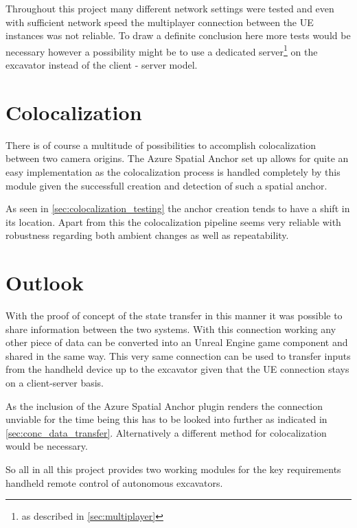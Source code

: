 Throughout this project many different network settings were tested and even with sufficient network speed the multiplayer connection between the UE instances was not reliable. To draw a definite conclusion here more tests would be necessary however a possibility might be to use a dedicated server\footnote{as described in \cref{sec:multiplayer}} on the excavator instead of the client - server model.

\section{Colocalization}\label{sec:conc_colocalization}

There is of course a multitude of possibilities to accomplish colocalization between two camera origins. The Azure Spatial Anchor set up allows for quite an easy implementation as the colocalization process is handled completely by this module given the successfull creation and detection of such a spatial anchor.

As seen in \cref{sec:colocalization_testing} the anchor creation tends to have a shift in its location. Apart from this the colocalization pipeline seems very reliable with robustness regarding both ambient changes as well as repeatability.

\section{Outlook}\label{sec:outlook}

With the proof of concept of the state transfer in this manner it was possible to share information between the two systems. With this connection working any other piece of data can be converted into an Unreal Engine game component and shared in the same way. This very same connection can be used to transfer inputs from the handheld device up to the excavator given that the UE connection stays on a client-server basis.

As the inclusion of the Azure Spatial Anchor plugin renders the connection unviable for the time being this has to be looked into further as indicated in \cref{sec:conc_data_transfer}. Alternatively a different method for colocalization would be necessary. 

So all in all this project provides two working modules for the key requirements handheld remote control of autonomous excavators.

